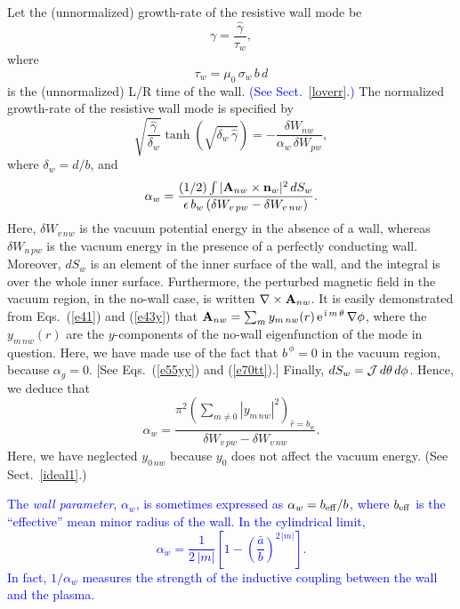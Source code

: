 \documentclass[12pt,prb,aps]{revtex4-1}
\begin{document}
 Let the (unnormalized) 
 growth-rate of the resistive wall mode be
 \begin{equation}
 \gamma= \frac{\hat{\gamma}}{\tau_w},
 \end{equation}
 where
 \begin{equation}
 \tau_w = \mu_0\,\sigma_w\,b\,d
 \end{equation}
 is the (unnormalized) L/R time of the wall. \textcolor{blue}{(See Sect.~\ref{loverr}.) }
 The normalized growth-rate of the resistive wall mode is specified by\,\cite{rwm4,rwm5}
 \begin{equation}\label{rwm}
 \sqrt{\frac{\hat{\gamma}}{\delta_w}}\tanh\left(\sqrt{\delta_w\,\hat{\gamma}}\right) = -\frac{\delta W_{nw}}{\alpha_w\,\delta W_{pw}},
 \end{equation}
 where $\delta_w=d/b$, 
and
 \begin{equation}
 \alpha_w = \frac{(1/2)\int|{\bf A}_{nw}\times {\bf n}_w|^2\,dS_w}{\epsilon\,b_w\,(\delta W_{v\,pw}- \delta W_{v\,nw})}.
 \end{equation}
  Here,  $\delta W_{v\,nw}$ is the vacuum potential energy in the absence of a wall, whereas $\delta W_{n\,pw}$ is the vacuum energy in the presence of a
 perfectly conducting wall. 
 Moreover, $dS_w$ is an element of the inner  surface of the wall, and the integral is over the whole inner surface. Furthermore,
 the perturbed magnetic field in the vacuum region, in the no-wall case, is written $\nabla\times {\bf A}_{nw}$. 
 It is easily demonstrated from Eqs.~(\ref{e41}) and (\ref{e43y}) that ${\bf A}_{nw}= \sum_{m} y_{m\,nw}(r)\,{\rm e}^{\,{\rm i}\,m\,\theta}\,\nabla\phi$,
 where the $y_{m\,nw}(r)$ are the $y$-components of the no-wall eigenfunction of the mode in question. Here, we have made use of the fact that $b^{\,\phi}=0$
 in the vacuum region, because $\alpha_g=0$. [See Eqs.~(\ref{e55yy}) and (\ref{e70tt}).]
  Finally, $dS_w= {\cal J}\,d\theta\,d\phi$. 
 Hence, we deduce that
 \begin{equation}\label{alphaw}
 \alpha_w = \frac{\pi^2\left(\sum_{m\neq 0} |y_{m\,nw}|^2\right)_{\hat{r}=b_w}}{\delta W_{v\,pw}- \delta W_{v\,nw}}.
 \end{equation}
 Here, we have neglected $y_{0\,nw}$ because $y_0$ does not affect the vacuum energy. (See Sect.~\ref{ideal1}.)

\textcolor{blue}{
The {\em wall parameter}, $\alpha_w$, is sometimes expressed as $\alpha_w= b_{\rm eff}/b$, where $b_{\rm eff}$ is the ``effective'' mean minor radius of the wall.\cite{rwm4}
 In the cylindrical limit, 
 \begin{equation}
 \alpha_w = \frac{1}{2\,|m|}\left[1-\left(\frac{\bar{a}}{b}\right)^{2\,|m|}\right].
 \end{equation}
 In fact, $1/\alpha_w$ measures the strength of the inductive coupling between the wall and the plasma.} 
\end{document}

